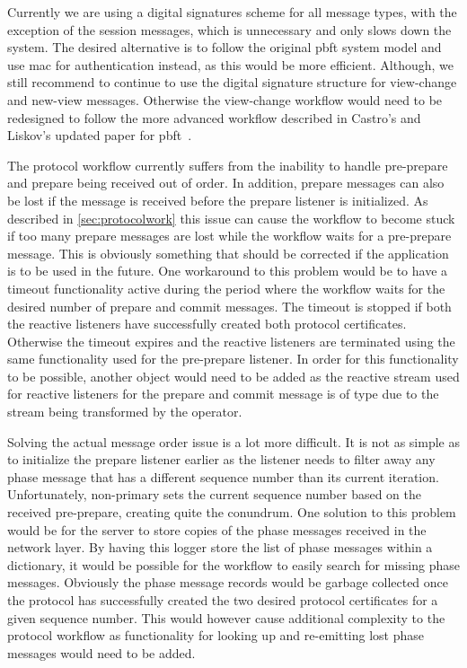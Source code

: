 Currently we are using a digital signatures scheme for all message types, with the exception of the session messages, which is unnecessary and only slows down the system. The desired alternative is to follow the original \ac{pbft} system model and use \ac{mac} for authentication instead, as this would be more efficient. Although, we still recommend to continue to use the digital signature structure for view-change and new-view messages. Otherwise the view-change workflow would need to be redesigned to follow the more advanced workflow described in Castro's and Liskov's updated paper for \ac{pbft}~\cite[p.~410-414]{PAPER:PBFTRecovery}.

The protocol workflow currently suffers from the inability to handle pre-prepare and prepare being received out of order. In addition, prepare messages can also be lost if the message is received before the prepare listener is initialized. As described in \autoref{sec:protocolwork} this issue can cause the workflow to become stuck if too many prepare messages are lost while the workflow waits for a pre-prepare message. This is obviously something that should be corrected if the application is to be used in the future. One workaround to this problem would be to have a timeout functionality active during the period where the workflow waits for the desired number of prepare and commit messages. The timeout is stopped if both the reactive listeners have successfully created both protocol certificates. Otherwise the timeout expires and the reactive listeners are terminated using the same functionality used for the pre-prepare listener. In order for this functionality to be possible, another  object would need to be added as the reactive stream used for reactive listeners for the prepare and commit message is of type  due to the stream being transformed by the  operator.

Solving the actual message order issue is a lot more difficult. It is not as simple as to initialize the prepare listener earlier as the listener needs to filter away any phase message that has a different sequence number than its current iteration. Unfortunately, non-primary sets the current sequence number based on the received pre-prepare, creating quite the conundrum. One solution to this problem would be for the server to store copies of the phase messages received in the network layer. By having this logger store the list of phase messages within a dictionary, it would be possible for the workflow to easily search for missing phase messages. Obviously the phase message records would be garbage collected once the protocol has successfully created the two desired protocol certificates for a given sequence number. This would however cause additional complexity to the protocol workflow as functionality for looking up and re-emitting lost phase messages would need to be added.

